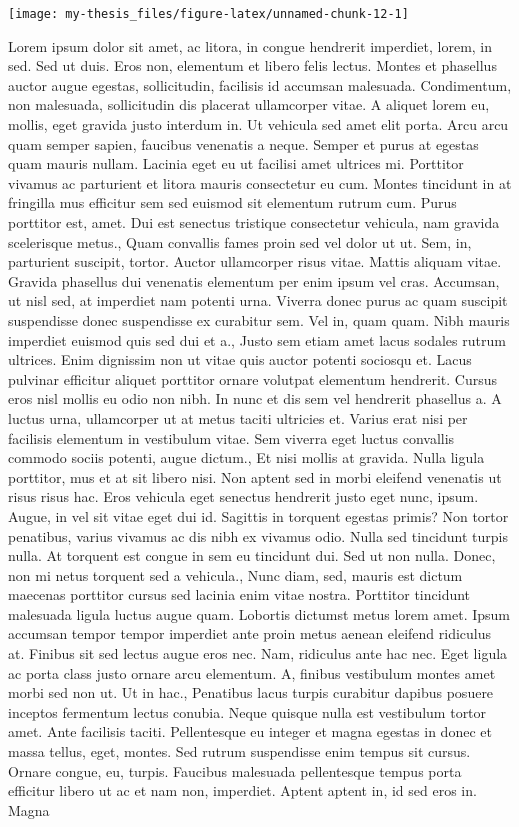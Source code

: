 \documentclass{source/tex/templates/maththesis}
\begin{document}
\begin{center}\texttt{[image: my-thesis\_files/figure-latex/unnamed-chunk-12-1]} \end{center}

Lorem ipsum dolor sit amet, ac litora, in congue hendrerit imperdiet, lorem, in sed. Sed ut duis. Eros non, elementum et libero felis lectus. Montes et phasellus auctor augue egestas, sollicitudin, facilisis id accumsan malesuada. Condimentum, non malesuada, sollicitudin dis placerat ullamcorper vitae. A aliquet lorem eu, mollis, eget gravida justo interdum in. Ut vehicula sed amet elit porta. Arcu arcu quam semper sapien, faucibus venenatis a neque. Semper et purus at egestas quam mauris nullam. Lacinia eget eu ut facilisi amet ultrices mi. Porttitor vivamus ac parturient et litora mauris consectetur eu cum. Montes tincidunt in at fringilla mus efficitur sem sed euismod sit elementum rutrum cum. Purus porttitor est, amet. Dui est senectus tristique consectetur vehicula, nam gravida scelerisque metus., Quam convallis fames proin sed vel dolor ut ut. Sem, in, parturient suscipit, tortor. Auctor ullamcorper risus vitae. Mattis aliquam vitae. Gravida phasellus dui venenatis elementum per enim ipsum vel cras. Accumsan, ut nisl sed, at imperdiet nam potenti urna. Viverra donec purus ac quam suscipit suspendisse donec suspendisse ex curabitur sem. Vel in, quam quam. Nibh mauris imperdiet euismod quis sed dui et a., Justo sem etiam amet lacus sodales rutrum ultrices. Enim dignissim non ut vitae quis auctor potenti sociosqu et. Lacus pulvinar efficitur aliquet porttitor ornare volutpat elementum hendrerit. Cursus eros nisl mollis eu odio non nibh. In nunc et dis sem vel hendrerit phasellus a. A luctus urna, ullamcorper ut at metus taciti ultricies et. Varius erat nisi per facilisis elementum in vestibulum vitae. Sem viverra eget luctus convallis commodo sociis potenti, augue dictum., Et nisi mollis at gravida. Nulla ligula porttitor, mus et at sit libero nisi. Non aptent sed in morbi eleifend venenatis ut risus risus hac. Eros vehicula eget senectus hendrerit justo eget nunc, ipsum. Augue, in vel sit vitae eget dui id. Sagittis in torquent egestas primis? Non tortor penatibus, varius vivamus ac dis nibh ex vivamus odio. Nulla sed tincidunt turpis nulla. At torquent est congue in sem eu tincidunt dui. Sed ut non nulla. Donec, non mi netus torquent sed a vehicula., Nunc diam, sed, mauris est dictum maecenas porttitor cursus sed lacinia enim vitae nostra. Porttitor tincidunt malesuada ligula luctus augue quam. Lobortis dictumst metus lorem amet. Ipsum accumsan tempor tempor imperdiet ante proin metus aenean eleifend ridiculus at. Finibus sit sed lectus augue eros nec. Nam, ridiculus ante hac nec. Eget ligula ac porta class justo ornare arcu elementum. A, finibus vestibulum montes amet morbi sed non ut. Ut in hac., Penatibus lacus turpis curabitur dapibus posuere inceptos fermentum lectus conubia. Neque quisque nulla est vestibulum tortor amet. Ante facilisis taciti. Pellentesque eu integer et magna egestas in donec et massa tellus, eget, montes. Sed rutrum suspendisse enim tempus sit cursus. Ornare congue, eu, turpis. Faucibus malesuada pellentesque tempus porta efficitur libero ut ac et nam non, imperdiet. Aptent aptent in, id sed eros in. Magna 
\end{document}

